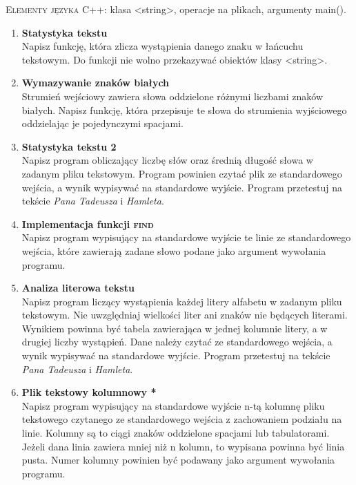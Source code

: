 \documentclass[12pt]{article}
\begin{document}
\small \textsc{Elementy języka C++:} klasa <string>, operacje na plikach, argumenty main().

\begin{enumerate}

\item \textbf{Statystyka tekstu}\\
Napisz funkcję, która zlicza wystąpienia danego znaku w łańcuchu tekstowym. Do funkcji nie wolno przekazywać obiektów klasy <string>.

\item \textbf{Wymazywanie znaków białych}\\
Strumień wejściowy zawiera słowa oddzielone różnymi liczbami znaków białych. Napisz funkcję, która przepisuje te słowa do strumienia wyjściowego oddzielając je pojedynczymi spacjami.

\item \textbf{Statystyka tekstu 2}\\
Napisz program obliczający liczbę słów oraz średnią długość słowa w zadanym pliku tekstowym. Program powinien czytać plik ze standardowego wejścia, a wynik wypisywać na standardowe wyjście. Program przetestuj na tekście \textit{Pana Tadeusza} i \textit{Hamleta}.

\item \textbf{Implementacja funkcji \textsc{find}}\\
Napisz program wypisujący na standardowe wyjście te linie ze standardowego wejścia, które zawierają zadane słowo podane jako argument wywołania programu.

\item \textbf{Analiza literowa tekstu}\\
Napisz program liczący wystąpienia każdej litery alfabetu w zadanym pliku tekstowym. Nie uwzględniaj wielkości liter ani znaków nie będących literami. Wynikiem powinna być tabela zawierająca w jednej kolumnie litery, a w drugiej liczby wystąpień. Dane należy czytać ze standardowego wejścia, a wynik wypisywać na standardowe wyjście. Program przetestuj na tekście \textit{Pana Tadeusza} i \textit{Hamleta}.

\item \textbf{Plik tekstowy kolumnowy *}\\
Napisz program wypisujący na standardowe wyjście n-tą kolumnę pliku tekstowego czytanego ze standardowego wejścia z zachowaniem podziału na linie. Kolumny są to ciągi znaków oddzielone spacjami lub tabulatorami. Jeżeli dana linia zawiera mniej niż n kolumn, to wypisana powinna być linia pusta. Numer kolumny powinien być podawany jako argument wywołania programu.


\end{enumerate}
\end{document}
